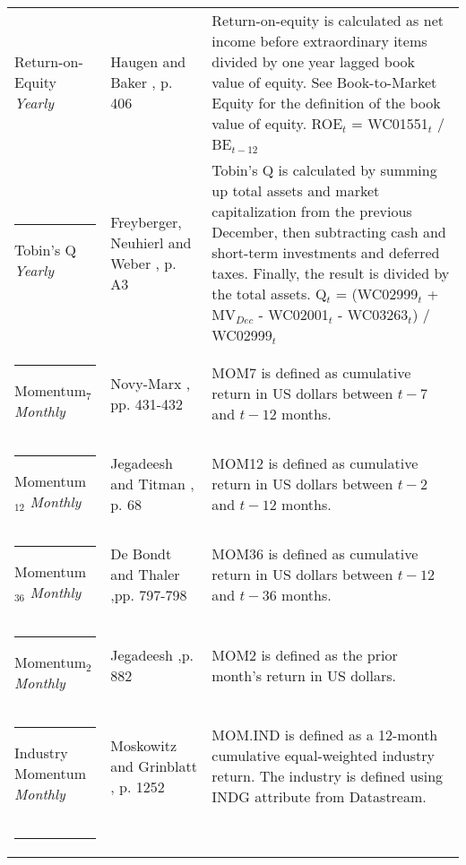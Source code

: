 \documentclass[12pt]{article}
\begin{document}
\begin{appendices}
{{\begin{xltabular}{\textwidth}{ >{\raggedright\arraybackslash}p{0.23\textwidth} >{\raggedright\arraybackslash}p{0.2\textwidth} X}
Return-on-Equity \newline \emph{Yearly}		& Haugen and Baker \citeyearpar{HAUGEN1996}, p. 406		& Return-on-equity is calculated as net income before extraordinary items divided by one year lagged book value of equity. See Book-to-Market Equity for the definition of the book value of equity. \newline ROE$_t$ = WC01551$_{t}$ / BE$_{t-12}$ \\ \rule{-1ex}{3ex}
Tobin's Q 	\newline \emph{Yearly}			& Freyberger, Neuhierl and Weber \citeyearpar{Freyberger2020}, p. A3 & Tobin's Q is calculated by summing up total assets and market capitalization from the previous December, then subtracting cash and short-term investments and deferred taxes. Finally, the result is divided by the total assets. \newline Q$_t$ = (WC02999$_{t}$ + MV$_{Dec}$ - WC02001$_{t}$ - WC03263$_{t}$) / WC02999$_{t}$ \\ \rule{-1ex}{3ex}
Momentum$_{7}$ \newline \emph{Monthly}	& Novy-Marx \citeyearpar{NOVYMARX2012}, pp. 431-432	& MOM7 is defined as cumulative return in US dollars between $t-7$ and $t-12$ months.\\ \rule{-1ex}{3ex}
Momentum$_{12}$ \newline \emph{Monthly}	& Jegadeesh and Titman \citeyearpar{Jegadeesh1993}, p. 68	& MOM12 is defined as cumulative return in US dollars between $t-2$ and $t-12$ months.\\ \rule{-1ex}{3ex}
Momentum$_{36}$ \newline \emph{Monthly}	& De Bondt and Thaler \citeyearpar{DeBondt1985},\newline pp. 797-798 & MOM36 is defined as cumulative return in US dollars between $t-12$ and $t-36$ months.\\ \rule{-1ex}{3ex}
Momentum$_{2}$ \newline \emph{Monthly}	& Jegadeesh \citeyearpar{Jegadeesh1990},\newline p. 882	& MOM2 is defined as the prior month's return in US dollars.\\ \rule{-1ex}{3ex}
Industry Momentum \newline \emph{Monthly} 	& Moskowitz and Grinblatt \citeyearpar{Moskowitz1999}, \newline p. 1252& MOM.IND is defined as a 12-month cumulative equal-weighted industry return. The industry is defined using INDG attribute from Datastream.\footnotemark {} \\ \rule{-1ex}{3ex}

\end{xltabular}}}
\end{appendices}
\end{document}
